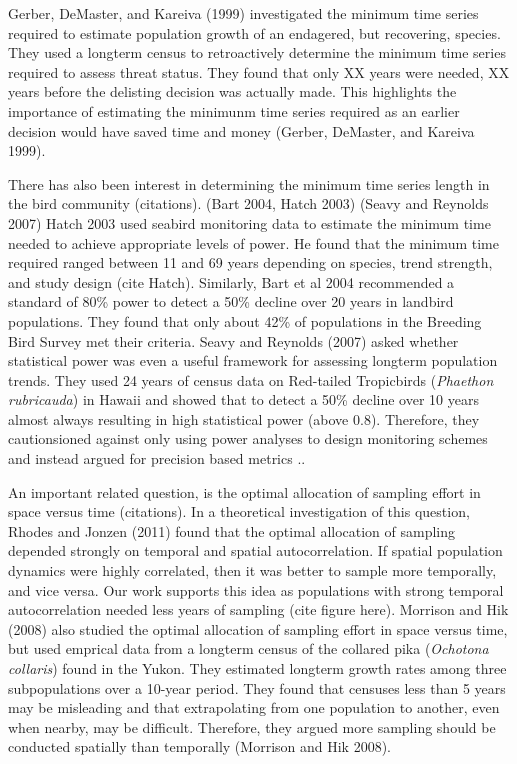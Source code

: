 \documentclass[12pt,]{article}
\begin{document}
Gerber, DeMaster, and Kareiva (1999) investigated the minimum time
series required to estimate population growth of an endagered, but
recovering, species. They used a longterm census to retroactively
determine the minimum time series required to assess threat status. They
found that only XX years were needed, XX years before the delisting
decision was actually made. This highlights the importance of estimating
the minimunm time series required as an earlier decision would have
saved time and money (Gerber, DeMaster, and Kareiva 1999).

There has also been interest in determining the minimum time series
length in the bird community (citations). (Bart 2004, Hatch 2003) (Seavy
and Reynolds 2007) Hatch 2003 used seabird monitoring data to estimate
the minimum time needed to achieve appropriate levels of power. He found
that the minimum time required ranged between 11 and 69 years depending
on species, trend strength, and study design (cite Hatch). Similarly,
Bart et al 2004 recommended a standard of 80\% power to detect a 50\%
decline over 20 years in landbird populations. They found that only
about 42\% of populations in the Breeding Bird Survey met their
criteria. Seavy and Reynolds (2007) asked whether statistical power was
even a useful framework for assessing longterm population trends. They
used 24 years of census data on Red-tailed Tropicbirds
(\emph{Phaethon rubricauda}) in Hawaii and showed that to detect a 50\%
decline over 10 years almost always resulting in high statistical power
(above 0.8). Therefore, they cautionsioned against only using power
analyses to design monitoring schemes and instead argued for precision
based metrics ..

An important related question, is the optimal allocation of sampling
effort in space versus time (citations). In a theoretical investigation
of this question, Rhodes and Jonzen (2011) found that the optimal
allocation of sampling depended strongly on temporal and spatial
autocorrelation. If spatial population dynamics were highly correlated,
then it was better to sample more temporally, and vice versa. Our work
supports this idea as populations with strong temporal autocorrelation
needed less years of sampling (cite figure here). Morrison and Hik
(2008) also studied the optimal allocation of sampling effort in space
versus time, but used emprical data from a longterm census of the
collared pika (\emph{Ochotona collaris}) found in the Yukon. They
estimated longterm growth rates among three subpopulations over a
10-year period. They found that censuses less than 5 years may be
misleading and that extrapolating from one population to another, even
when nearby, may be difficult. Therefore, they argued more sampling
should be conducted spatially than temporally (Morrison and Hik 2008).
\end{document}
